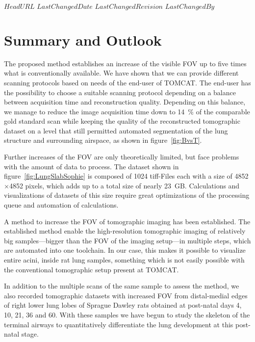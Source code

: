 \svnidlong
{$HeadURL$}
{$LastChangedDate$}
{$LastChangedRevision$}
{$LastChangedBy$}

\ifhtml
\else
\begin{center}
\end{center}
\fi

\section{Summary and Outlook}
\label{sec:summary}\label{sec:outlook}

The proposed method establishes an increase of the visible FOV up to five times what is conventionally available. We have shown that we can provide different scanning protocols based on needs of the end-user of TOMCAT. The end-user has the possibility to choose a suitable scanning protocol depending on a balance between acquisition time and reconstruction quality. \cbstart Depending on this balance, \cbend we manage to reduce the image acquisition time down to \SI{14}{\percent} of the comparable gold standard scan while keeping the quality of the reconstructed tomographic dataset on a level that still permitted automated segmentation of the lung structure and surrounding airspace, as shown in figure~\ref{fig:BvsT}.

Further increases of the FOV are only theoretically limited, but face problems with the amount of data to process. The dataset shown in figure~\ref{fig:LungSlabSophie} is composed of 1024 tiff-Files each with a size of 4852$\times$4852 pixels, which adds up to a total size of nearly \SI{23}{\giga B}. Calculations and visualizations of datasets of this size require great optimizations of the processing queue and automation of calculations.

\cbstart
A method to increase the FOV of tomographic imaging has been established. The established method enable the high-resolution tomographic imaging of relatively big samples---bigger than the FOV of the imaging setup---in multiple steps, which are automated into one toolchain. In our case, this makes it possible to visualize entire acini, inside rat lung samples, something which is not easily possible with the conventional tomographic setup present at TOMCAT.
\cbend

In addition to the multiple scans of the same sample to assess the method, we also recorded tomographic datasets with increased FOV from distal-medial edges of right lower lung lobes of Sprague Dawley rats obtained at post-natal days 4, 10, 21, 36 and 60. With these samples we have begun to study the skeleton of the terminal airways to quantitatively differentiate the lung development at this post-natal stage.